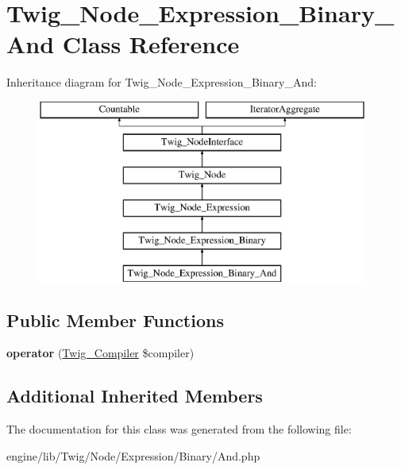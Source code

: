 \hypertarget{class_twig___node___expression___binary___and}{}\section{Twig\+\_\+\+Node\+\_\+\+Expression\+\_\+\+Binary\+\_\+\+And Class Reference}
\label{class_twig___node___expression___binary___and}
Inheritance diagram for Twig\+\_\+\+Node\+\_\+\+Expression\+\_\+\+Binary\+\_\+\+And\+:\begin{figure}[H]
\begin{center}
\leavevmode
\includegraphics[height=6.000000cm]{class_twig___node___expression___binary___and}
\end{center}
\end{figure}
\subsection*{Public Member Functions}
\begin{DoxyCompactItemize}
\item 
\hypertarget{class_twig___node___expression___binary___and_af77318ec88d5f8a508684970a150b670}{}{\bfseries operator} (\hyperlink{class_twig___compiler}{Twig\+\_\+\+Compiler} \$compiler)\label{class_twig___node___expression___binary___and_af77318ec88d5f8a508684970a150b670}

\end{DoxyCompactItemize}
\subsection*{Additional Inherited Members}


The documentation for this class was generated from the following file\+:\begin{DoxyCompactItemize}
\item 
engine/lib/\+Twig/\+Node/\+Expression/\+Binary/And.\+php\end{DoxyCompactItemize}
